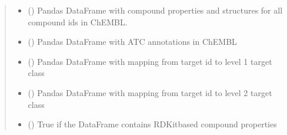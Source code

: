 \documentclass[letterpaper,10pt,english]{sphinxmanual}
\begin{document}
\begin{fulllineitems}
\begin{quote}
\begin{description}
\begin{itemize}
\item {} 
\sphinxAtStartPar
{} () \textendash{} Pandas DataFrame with compound properties and structures for all compound ids in ChEMBL.

\item {} 
\sphinxAtStartPar
{} () \textendash{} Pandas DataFrame with ATC annotations in ChEMBL

\item {} 
\sphinxAtStartPar
{} () \textendash{} Pandas DataFrame with mapping from target id to level 1 target class

\item {} 
\sphinxAtStartPar
{} () \textendash{} Pandas DataFrame with mapping from target id to level 2 target class

\item {} 
\sphinxAtStartPar
{} () \textendash{} True if the DataFrame contains RDKit\sphinxhyphen{}based compound properties

\end{itemize}

\end{description}\end{quote}

\end{fulllineitems}

\end{document}
